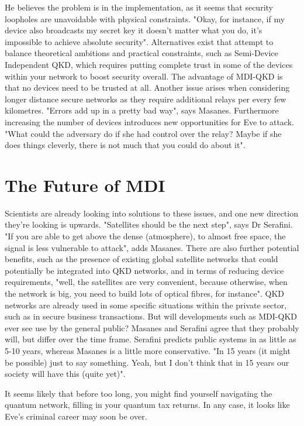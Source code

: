 \documentclass[journal]{vgtc}
\begin{document}
\noindent He believes the problem is in the implementation, as it seems that security loopholes are unavoidable with physical constraints. "Okay, for instance, if my device also broadcasts my secret key it doesn't matter what you do, it's impossible to achieve absolute security". Alternatives exist that attempt to balance theoretical ambitions and practical constraints, such as Semi-Device Independent QKD, which requires putting complete trust in some of the devices within your network to boost security overall. The advantage of MDI-QKD is that no devices need to be trusted at all. Another issue arises when considering longer distance secure networks as they require additional relays per every few kilometres. "Errors add up in a pretty bad way", says Masanes. Furthermore increasing the number of devices introduces new opportunities for Eve to attack. "What could the adversary do if she had control over the relay? Maybe if she does things cleverly, there is not much that you could do about it".


\section{The Future of MDI}

Scientists are already looking into solutions to these issues, and one new direction they're looking is upwards. "Satellites should be the next step", says Dr Serafini. "If you are able to get above the dense (atmosphere), to almost free space, the signal is less vulnerable to attack", adds Masanes. There are also further potential benefits, such as the presence of existing global satellite networks that could potentially be integrated into QKD networks, and in terms of reducing device requirements, "well, the satellites are very convenient, because otherwise, when the network is big, you need to build lots of optical fibres, for instance". QKD networks are already used in some specific situations within the private sector, such as in secure business transactions. But will developments such as MDI-QKD ever see use by the general public? Masanes and Serafini agree that they probably will, but differ over the time frame. Serafini predicts public systems in as little as 5-10 years, whereas Masanes is a little more conservative. "In 15 years (it might be possible) just to say something. Yeah, but I don't think that in 15 years our society will have this (quite yet)".

\vspace{0.3cm}

\noindent It seems likely that before too long, you might find yourself navigating the quantum network, filling in your quantum tax returns. In any case, it looks like Eve's criminal career may soon be over.



  

\end{document}
